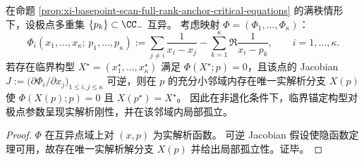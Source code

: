 \begin{proposition}\label{prop:xi-basepoint-scan-critical-configuration-analytic-rigidity}
在命题 \ref{prop:xi-basepoint-scan-full-rank-anchor-critical-equations} 的满秩情形下，设极点多重集 \(\{p_k\}\subset\CC_{-}\) 互异。
考虑映射 \(\Phi=(\Phi_1,\dots,\Phi_\kappa)\)：
\[
\Phi_i(x_1,\dots,x_\kappa;\,p_1,\dots,p_\kappa)
:=\sum_{j\ne i}\frac{1}{x_i-x_j}-\sum_{k=1}^{\kappa}\Re\frac{1}{x_i-p_k},
\qquad i=1,\dots,\kappa.
\]
若存在临界构型 \(X^\star=(x_1^\star,\dots,x_\kappa^\star)\) 满足 \(\Phi(X^\star;p)=0\)，且该点的 Jacobian
\(
J:=\bigl(\partial \Phi_i/\partial x_j\bigr)_{1\le i,j\le \kappa}
\)
可逆，则在 \(p\) 的充分小邻域内存在唯一实解析分支 \(X(p)\) 使 \(\Phi(X(p);p)=0\) 且 \(X(p^\star)=X^\star\)。
因此在非退化条件下，临界锚定构型对极点参数呈现实解析刚性，并在该邻域内局部孤立。
\end{proposition}
\begin{proof}
\(\Phi\) 在互异点域上对 \((x,p)\) 为实解析函数。
可逆 Jacobian 假设使隐函数定理可用，故存在唯一实解析解分支 \(X(p)\) 并给出局部孤立性。证毕。
\end{proof}




\endinput
